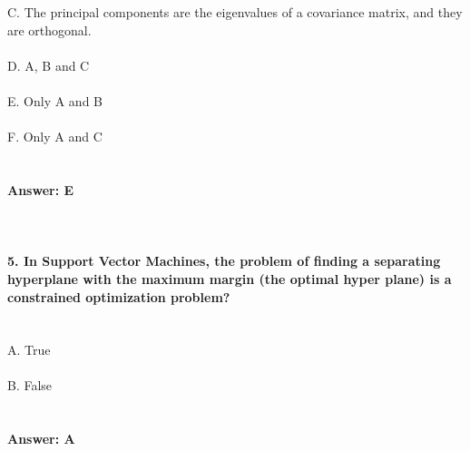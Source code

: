 \documentclass[prl,twocolumn,showpacs,preprintnumbers,superscriptaddress]{revtex4}
\theoremstyle{plain}
\theoremstyle{definition}
\begin{document}
\begin{widetext}
C. The principal components are the eigenvalues of a covariance matrix, and they are orthogonal.
\\
\\
D. A, B and C
\\
\\
E. Only A and B
\\
\\
F. Only A and C
\\
\\
\\
\textbf{Answer: E}
\\
\\
\\
\\
\textbf{5. In Support Vector Machines, the problem of finding a separating hyperplane with the maximum margin (the optimal hyper plane) is a constrained
optimization problem?}
\\
\\
\\
A. True
\\
\\
B. False
\\
\\
\\
\textbf{Answer: A}
\end{widetext}
\end{document}
